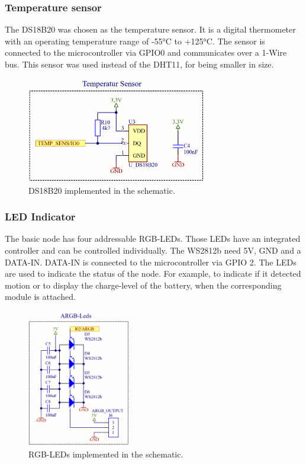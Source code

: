     \subsubsection{Temperature sensor}
        The DS18B20 was chosen as the temperature sensor. It is a digital thermometer
        with an operating temperature range of -55°C to +125°C. The sensor is connected
        to the microcontroller via GPIO0 and communicates over a 1-Wire bus.
        This sensor was used instead of the DHT11, for being smaller in size.

        \begin{figure}[H]
            \centering
            \includegraphics[width=0.7\textwidth]{assets/HW/DS18B20-schematic.png}
            \caption{DS18B20 implemented in the schematic.}
        \end{figure}

    \subsubsection{LED Indicator}
        The basic node has four addressable RGB-LEDs. Those LEDs have an integrated 
        controller and can be controlled individually. The WS2812b need 5V, GND and a DATA-IN.
        DATA-IN is connected to the microcontroller via GPIO 2. The LEDs are used to 
        indicate the status of the node. For example, to indicate if it detected motion or 
        to display the charge-level of the battery, when the corresponding module is attached.

        \begin{figure}[H]
            \centering
            \includegraphics[width=0.4\textwidth]{assets/HW/RGB-LED-schematic.png}
            \caption{RGB-LEDs implemented in the schematic.}
        \end{figure}

